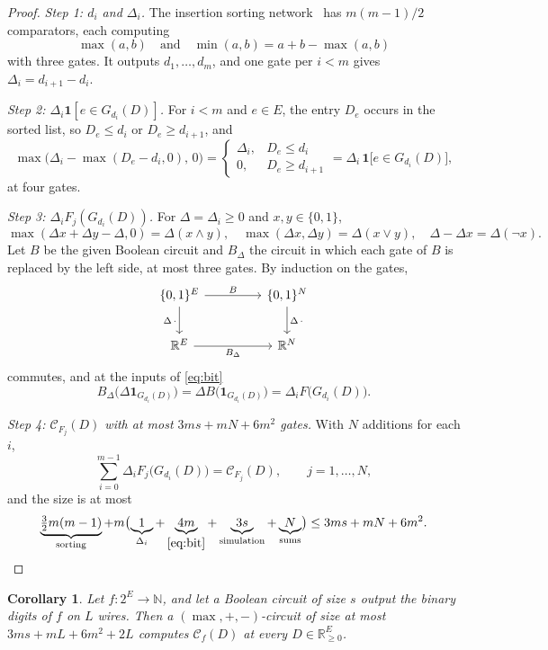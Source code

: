 \documentclass[11pt]{article}
\newtheorem{corollary}[theorem]{Corollary}
\newcommand{\R}{\mathbb R}
\newcommand{\CC}{\mathcal C}
\begin{document}
\begin{proof}
\emph{Step 1: $d_i$ and $\Delta_i$.}  The insertion sorting network~\cite{knuth98-taocp3} has
$m(m-1)/2$ comparators, each computing
\[
  \max(a,b)\quad\text{and}\quad\min(a,b)=a+b-\max(a,b)
\]
with three gates.  It outputs $d_1,\ldots,d_m$, and one gate per $i<m$ gives
$\Delta_i=d_{i+1}-d_i$.

\emph{Step 2: $\Delta_i\mathbf 1[e\in G_{d_i}(D)]$.}  For $i<m$ and $e\in E$, the entry $D_e$
occurs in the sorted list, so $D_e\le d_i$ or $D_e\ge d_{i+1}$, and
\begin{equation}
  \max\bigl(\Delta_i-\max(D_e-d_i,0),\,0\bigr)
  =\begin{cases}\Delta_i,&D_e\le d_i\\0,&D_e\ge d_{i+1}\end{cases}
  =\Delta_i\,\mathbf 1\bigl[e\in G_{d_i}(D)\bigr],
  \label{eq:bit}
\end{equation}
at four gates.

\emph{Step 3: $\Delta_iF_j(G_{d_i}(D))$.}  For $\Delta=\Delta_i\ge0$ and $x,y\in\{0,1\}$,
\[
  \max(\Delta x+\Delta y-\Delta,0)=\Delta(x\wedge y),\quad
  \max(\Delta x,\Delta y)=\Delta(x\vee y),\quad
  \Delta-\Delta x=\Delta(\neg x).
\]
Let $B$ be the given Boolean circuit and $B_\Delta$ the circuit in which each gate of
$B$ is replaced by the left side, at most three gates.  By induction on the gates,
\[
  \begin{tikzcd}[column sep=4.5em,row sep=2.2em]
    \{0,1\}^{E}\arrow[r,"B"]\arrow[d,"\Delta\,\cdot"'] & \{0,1\}^{N}\arrow[d,"\Delta\,\cdot"]\\
    \R^{E}\arrow[r,"B_\Delta"'] & \R^{N}
  \end{tikzcd}
\]
commutes, and at the inputs of \eqref{eq:bit}
\[
  B_\Delta\bigl(\Delta\mathbf 1_{G_{d_i}(D)}\bigr)=\Delta B\bigl(\mathbf 1_{G_{d_i}(D)}\bigr)
  =\Delta_iF\bigl(G_{d_i}(D)\bigr).
\]

\emph{Step 4: $\CC_{F_j}(D)$ with at most $3ms+mN+6m^{2}$ gates.}  With $N$ additions for each $i$,
\[
  \sum_{i=0}^{m-1}\Delta_iF_j\bigl(G_{d_i}(D)\bigr)=\CC_{F_j}(D),\qquad j=1,\ldots,N,
\]
and the size is at most
\[
  \underbrace{\tfrac32m(m-1)}_{\text{sorting}}
  +m\bigl(\underbrace{1}_{\Delta_i}+\underbrace{4m}_{\eqref{eq:bit}}
  +\underbrace{3s}_{\text{simulation}}+\underbrace{N}_{\text{sums}}\bigr)
  \le3ms+mN+6m^{2}.\qedhere
\]
\end{proof}

\begin{corollary}
\label{cor:integer}
Let $f:2^{E}\to\mathbb N$, and let a Boolean circuit of size $s$ output the
binary digits of $f$ on $L$ wires.  Then a $(\max,+,-)$-circuit of size at
most $3ms+mL+6m^{2}+2L$ computes $\CC_f(D)$ at every $D\in\R^{E}_{\ge0}$.
\end{corollary}
\end{document}
